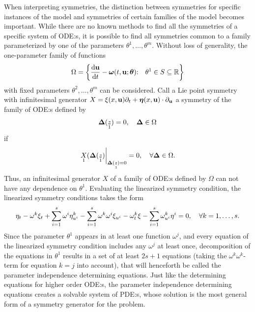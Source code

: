 When interpreting symmetries, the distinction between symmetries for specific instances of the model and symmetries of certain families of the model becomes important.
While there are no known methods to find all the symmetries of a specific system of ODE:s, it is possible to find all symmetries common to a family parameterized by one of the parameters \(\theta^1, \dots, \theta^m\).
Without loss of generality, the one-parameter family of functions
\begin{equation} \label{eq:generic-param-family}
  \Omega = \left\{\diff{\vb{u}}{t} - \vb*{\omega}(t, \vb{u}; \vb*{\theta})\qq*{:} \theta^1 \in S \subseteq \reals \right\}
\end{equation}
with fixed parameters \(\theta^2, \dots, \theta^m\) can be considered.
Call a Lie point symmetry with infinitesimal generator \(X = \xi(x, \vb{u}) \partial_t + \vb*{\eta}(x, \vb{u}) \cdot \partial_{\vb{u}}\) a symmetry of the family of ODE:s defined by
\begin{equation}
  \vb*{\Delta}(\prolong{z}{1}) = 0 \qc \vb*{\Delta} \in \Omega
\end{equation}
if
\begin{equation}
  \eval{\prolong{X}{1}(\vb*{\Delta}(\prolong{z}{1})}_{\vb*{\Delta}(\prolong{z}{1}) = 0} = 0 \qc \forall \vb*{\Delta} \in \Omega.
\end{equation}
Thus, an infinitesimal generator \(X\) of a family of ODE:s defined by \(\Omega\) can not have any dependence on \(\theta^1\).
Evaluating the linearized symmetry condition, the linearized symmetry conditions takes the form
\begin{equation}
  \eta_t - \omega^k \xi_t + \sum_{i=1}^s \omega^i \eta^k_{u^i} - \sum_{i=1}^s \omega^k \omega^i \xi_{u^i} -
  \omega^k_t \xi - \sum_{i=1}^s \omega^k_{u^i} \eta^i = 0 \qc \forall k = 1, \dots, s.
\end{equation}
Since the parameter \(\theta^1\) appears in at least one function \(\omega^j\), and every equation of the linearized symmetry condition includes any \(\omega^j\) at least once, decomposition of the equations in \(\theta^1\) results in a set of at least \(2 s + 1\) equations (taking the \(\omega^k \omega^k\)-term for equation \(k = j\) into account), that will henceforth be called the parameter independence determining equations.
Just like the determining equations for higher order ODE:s, the parameter independence determining equations creates a solvable system of PDE:s, whose solution is the most general form of a symmetry generator for the problem.

